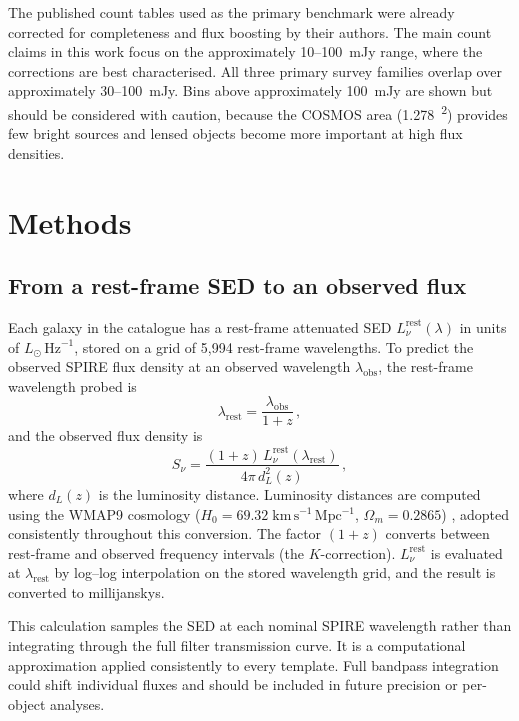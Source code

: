 \documentclass[12pt,a4paper]{article}
\begin{document}
The published count tables used as the primary benchmark were already corrected for
completeness and flux boosting by their authors. The main count claims in this work focus on
the approximately 10--\SI{100}{mJy} range, where the corrections are best characterised.
All three primary survey families overlap over approximately 30--\SI{100}{mJy}. Bins above approximately
\SI{100}{mJy} are shown but should be considered with caution, because the COSMOS area
(\SI{1.278}{\deg\squared}) provides few bright sources and lensed objects become more
important at high flux densities.

\section{Methods}
\label{sec:methods}

\subsection{From a rest-frame SED to an observed flux}
\label{sec:methods:flux}

Each galaxy in the \popcosmos{} catalogue has a rest-frame attenuated SED
$L_\nu^\mathrm{rest}(\lambda)$ in units of $L_\odot\,\mathrm{Hz}^{-1}$, stored on a
grid of 5,994 rest-frame wavelengths. To predict the observed SPIRE flux density at an observed wavelength $\lambda_\mathrm{obs}$, the
rest-frame wavelength probed is
\begin{equation}
  \lambda_\mathrm{rest} = \frac{\lambda_\mathrm{obs}}{1+z}\,,
  \label{eq:restlam}
\end{equation}
and the observed flux density is
\begin{equation}
  S_\nu = \frac{(1+z)\,L_\nu^\mathrm{rest}(\lambda_\mathrm{rest})}
               {4\pi\,d_L^2(z)}\,,
  \label{eq:flux}
\end{equation}
where $d_L(z)$ is the luminosity distance. Luminosity distances are computed using the
WMAP9 cosmology ($H_0 = 69.32\;\mathrm{km\,s^{-1}\,Mpc^{-1}}$,
$\Omega_m = 0.2865$) \citep{Hinshaw_2013}, adopted consistently throughout this conversion. The factor
$(1+z)$ converts between rest-frame and observed frequency
intervals (the $K$-correction). $L_\nu^\mathrm{rest}$ is evaluated at
  $\lambda_\mathrm{rest}$ by log--log interpolation on the stored wavelength grid, and the
result is converted to millijanskys.

This calculation samples the SED at each nominal SPIRE wavelength rather than integrating
through the full filter transmission curve. It is a computational approximation applied
consistently to every template. Full bandpass integration could shift individual fluxes
and should be included in future precision or per-object analyses.
\end{document}
